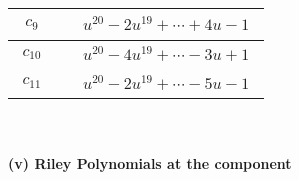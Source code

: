 \documentclass[1p]{elsarticle_modified}
\theoremstyle{definition}
\begin{document}
\begin{tabular}{m{50pt}|m{274pt}}
\hline $$\begin{aligned}c_{9}\end{aligned}$$&$\begin{aligned}
&u^{20}-2 u^{19}+\cdots+4 u-1
\end{aligned}$\\
\hline $$\begin{aligned}c_{10}\end{aligned}$$&$\begin{aligned}
&u^{20}-4 u^{19}+\cdots-3 u+1
\end{aligned}$\\
\hline $$\begin{aligned}c_{11}\end{aligned}$$&$\begin{aligned}
&u^{20}-2 u^{19}+\cdots-5 u-1
\end{aligned}$\\
\hline
\end{tabular}\\~\\
\newpage\renewcommand{\arraystretch}{1}
\flushleft \textbf{(v) Riley Polynomials at the component}\newline \\
\end{document}
